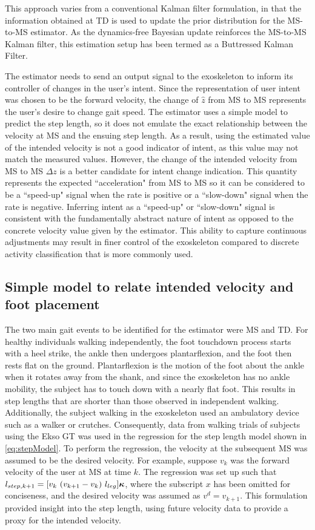 This approach varies from a conventional Kalman filter formulation, in that the information obtained at TD is used to update the prior distribution for the MS-to-MS estimator. As the dynamics-free Bayesian update reinforces the MS-to-MS Kalman filter, this estimation setup has been termed as a Buttressed Kalman Filter.

The estimator needs to send an output signal to the exoskeleton to inform its controller of changes in the user's intent. Since the representation of user intent was chosen to be the forward velocity, the change of $ \hat{z} $ from MS to MS represents the user's desire to change gait speed. The estimator uses a simple model to predict the step length, so it does not emulate the exact relationship between the velocity at MS and the ensuing step length. As a result, using the estimated value of the intended velocity is not a good indicator of intent, as this value may not match the measured values. However, the change of the intended velocity from MS to MS $ \Delta z $ is a better candidate for intent change indication. This quantity represents the expected ``acceleration" from MS to MS so it can be considered to be a ``speed-up" signal when the rate is positive or a ``slow-down" signal when the rate is negative. Inferring intent as a ``speed-up" or ``slow-down" signal is consistent with the fundamentally abstract nature of intent as opposed to the concrete velocity value given by the estimator. This ability to capture continuous adjustments may result in finer control of the exoskeleton compared to discrete activity classification that is more commonly used.

\subsection{Simple model to relate intended velocity and foot placement}

The two main gait events to be identified for the estimator were MS and TD. For healthy individuals walking independently, the foot touchdown process starts with a heel strike, the ankle then undergoes plantarflexion, and the foot then rests flat on the ground. Plantarflexion is the motion of the foot about the ankle when it rotates away from the shank, and since the exoskeleton has no ankle mobility, the subject has to touch down with a nearly flat foot. This results in step lengths that are shorter than those observed in independent walking. Additionally, the subject walking in the exoskeleton used an ambulatory device such as a walker or crutches. Consequently, data from walking trials of subjects using the Ekso GT \cite{exoWalkerData} was used in the regression for the step length model shown in \eqref{eq:stepModel}. To perform the regression, the velocity at the subsequent MS was assumed to be the desired velocity. For example, suppose $ v_k $ was the forward velocity of the user at MS at time $ k $. The regression was set up such that $ l_{step,{k+1}} = [v_{k}\ (v_{k+1}-v_{k})\ l_{leg}] \boldsymbol{\kappa} $, where the subscript $ x $ has been omitted for conciseness, and the desired velocity was assumed as $ v^d = v_{k+1} $. This formulation provided insight into the step length, using future velocity data to provide a proxy for the intended velocity.

